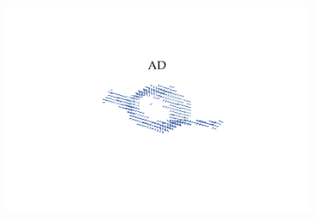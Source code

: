 
\begin{titlepage}

    \begin{addmargin}[-1cm]{-3cm}
        \begin{center}
            \large

            \hfill
            \vfill

            \begingroup
            \color{Maroon}\spacedallcaps{\myTitle} \\ \bigskip %
            \endgroup

            \spacedlowsmallcaps{\myName} %

            \vfill

            \includegraphics[trim={3.5cm 3.5cm 3.5cm 3.5cm},clip, width=10cm]{./svg-inkscape/ck_indAD_svg-tex.pdf} \\ \medskip %

            \mySubtitle \\ \medskip %

            \myTime\ %

            \vfill

        \end{center}
    \end{addmargin}

\end{titlepage}